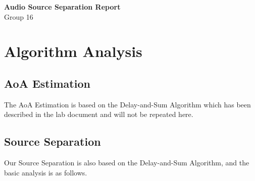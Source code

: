 \documentclass{article}
\author{Group 16}
\begin{document}
    \begin{center}   
        \huge 
        \textbf{Audio Source Separation Report}\\
        \normalsize{Group 16}
    \end{center}

    \normalsize
    \section{Algorithm Analysis}
        \subsection{AoA Estimation}
            The AoA Estimation is based on the Delay-and-Sum Algorithm which has been described in the lab document and will not be repeated here.






        \subsection{Source Separation}
        Our Source Separation is also based on the Delay-and-Sum Algorithm, and the basic analysis is as follows.
\end{document}
